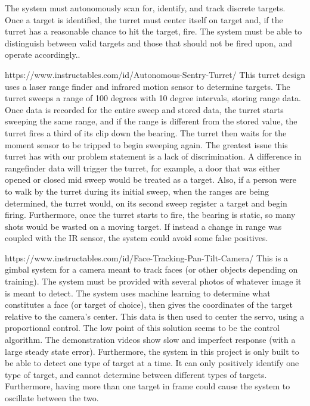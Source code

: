 The system must autonomously scan for, identify, and track discrete targets. Once a target is identified, the turret must center itself on target and, if the turret has a reasonable chance to hit the target, fire. The system must be able to distinguish between valid targets and those that should not be fired upon, and operate accordingly..


https://www.instructables.com/id/Autonomous-Sentry-Turret/
This turret design uses a laser range finder and infrared motion sensor to determine targets. The turret sweeps a range of 100 degrees with 10 degree intervals, storing range data. Once data is recorded for the entire sweep and stored data, the turret starts sweeping the same range, and if the range is different from the stored value, the turret fires a third of its clip down the bearing. The turret then waits for the moment sensor to be tripped to begin sweeping again.
	The greatest issue this turret has with our problem statement is a lack of discrimination. A difference in rangefinder data will trigger the turret, for example, a door that was either opened or closed mid sweep would be treated as a target. Also, if a person were to walk by the turret during its initial sweep, when the ranges are being determined, the turret would, on its second sweep register a target and begin firing. Furthermore, once the turret starts to fire, the bearing is static, so many shots would be wasted on a moving target. If instead a change in range was coupled with the IR sensor, the system could avoid some false positives.

https://www.instructables.com/id/Face-Tracking-Pan-Tilt-Camera/
This is a gimbal system for a camera meant to track faces (or other objects depending on training). The system must be provided with several photos of whatever image it is meant to detect. The system uses machine learning to determine what constitutes a face (or target of choice), then gives the coordinates of the target relative to the camera’s center. This data is then used to center the servo, using a proportional control.
	The low point of this solution seems to be the control algorithm. The demonstration videos show slow and imperfect response (with a large steady state error). Furthermore, the system in this project is only built to be able to detect one type of target at a time. It can only positively identify one type of target, and cannot determine between different types of targets. Furthermore, having more than one target in frame could cause the system to oscillate between the two.

